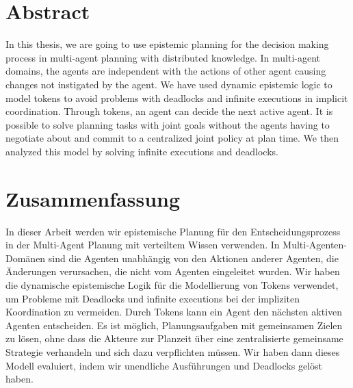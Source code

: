 \chapter*{Abstract}

In this thesis, we are going to use epistemic planning for the decision making process in multi-agent planning with distributed knowledge. In multi-agent domains, the agents are independent with the actions of other agent causing changes not instigated by the agent. We have used dynamic epistemic logic to model tokens to avoid problems with deadlocks and infinite executions in implicit coordination.
Through tokens, an agent can decide the next active agent. It is possible to solve planning tasks with joint goals without the agents having to negotiate about and commit to a centralized joint policy at plan time. We then analyzed this model by solving infinite executions and deadlocks.

\chapter*{Zusammenfassung}

In dieser Arbeit werden wir epistemische Planung für den Entscheidungsprozess in der Multi-Agent Planung mit verteiltem Wissen verwenden. In Multi-Agenten-Domänen sind die Agenten unabhängig von den Aktionen anderer Agenten, die Änderungen verursachen, die nicht vom Agenten eingeleitet wurden.
Wir haben die dynamische epistemische Logik für die Modellierung von Tokens verwendet, um Probleme mit Deadlocks und infinite executions bei der impliziten Koordination zu vermeiden. Durch Tokens kann ein Agent den nächsten aktiven Agenten entscheiden. Es ist möglich, Planungsaufgaben mit gemeinsamen Zielen zu lösen, ohne dass die Akteure zur Planzeit über eine zentralisierte gemeinsame Strategie verhandeln und sich dazu verpflichten müssen. Wir haben dann dieses Modell evaluiert, indem wir unendliche Ausführungen und Deadlocks gelöst haben.
